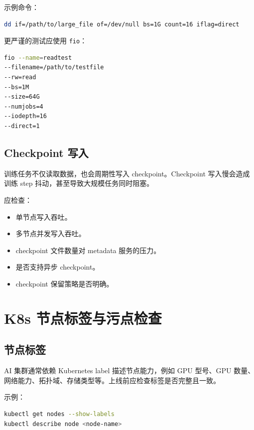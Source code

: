 示例命令：

\begin{lstlisting}[language=bash,caption={简单顺序读取测试},label={lst:storage-read-test}]
dd if=/path/to/large_file of=/dev/null bs=1G count=16 iflag=direct
\end{lstlisting}

更严谨的测试应使用 \texttt{fio}：

\begin{lstlisting}[language=bash,caption={fio 顺序读取测试示例},label={lst:fio-read-test}]
fio --name=readtest 
--filename=/path/to/testfile 
--rw=read 
--bs=1M 
--size=64G 
--numjobs=4 
--iodepth=16 
--direct=1
\end{lstlisting}

\subsection{Checkpoint 写入}

训练任务不仅读取数据，也会周期性写入 checkpoint。Checkpoint 写入慢会造成训练 step 抖动，甚至导致大规模任务同时阻塞。

应检查：

\begin{itemize}
\item 单节点写入吞吐。
\item 多节点并发写入吞吐。
\item checkpoint 文件数量对 metadata 服务的压力。
\item 是否支持异步 checkpoint。
\item checkpoint 保留策略是否明确。
\end{itemize}

\section{K8s 节点标签与污点检查}

\subsection{节点标签}

AI 集群通常依赖 Kubernetes label 描述节点能力，例如 GPU 型号、GPU 数量、网络能力、拓扑域、存储类型等。上线前应检查标签是否完整且一致。

示例：

\begin{lstlisting}[language=bash,caption={查看 Kubernetes 节点标签},label={lst:k8s-node-labels}]
kubectl get nodes --show-labels
kubectl describe node <node-name>
\end{lstlisting}

